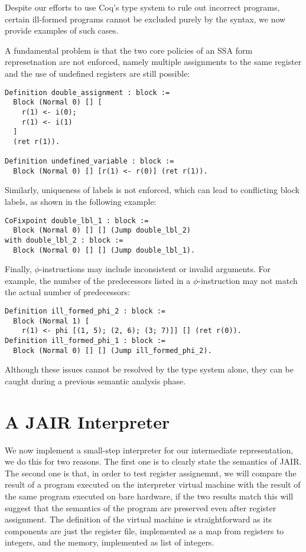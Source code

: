 Despite our efforts to use Coq's type system to rule out incorrect programs, certain ill-formed programs cannot be excluded purely by the syntax, we now provide examples of such cases.

A fundamental problem is that the two core policies of an SSA form represetnation are not enforced, namely multiple assignments to the same register and the use of undefined registers are still possible:

\begin{lstlisting}[style=Coq]
Definition double_assignment : block :=
  Block (Normal 0) [] [
    r(1) <- i(0);
    r(1) <- i(1)
  ]
  (ret r(1)).

Definition undefined_variable : block :=
  Block (Normal 0) [] [r(1) <- r(0)] (ret r(1)).
\end{lstlisting}

Similarly, uniqueness of labels is not enforced, which can lead to conflicting block labels, as shown in the following example:

\begin{lstlisting}[style=Coq]
CoFixpoint double_lbl_1 : block :=
  Block (Normal 0) [] [] (Jump double_lbl_2)
with double_lbl_2 : block :=
  Block (Normal 0) [] [] (Jump double_lbl_1).
\end{lstlisting}

Finally, $\phi$-instructions may include inconsistent or invalid arguments. For example, the number of the predecessors listed in a $\phi$-instruction may not match the actual number of predecessors:

\begin{lstlisting}[style=Coq]
Definition ill_formed_phi_2 : block :=
  Block (Normal 1) [
    r(1) <- phi [(1, 5); (2, 6); (3; 7)]] [] (ret r(0)).
Definition ill_formed_phi_1 : block :=
  Block (Normal 0) [] [] (Jump ill_formed_phi_2).
\end{lstlisting}

Although these issues cannot be resolved by the type system alone, they can be caught during a previous semantic analysis phase.

\section{A JAIR Interpreter}
\label{sec:jair-int}

We now implement a small-step interpreter for our intermediate representation, we do this for two reasons.
The first one is to clearly state the semantics of JAIR. The second one is that, in order to test register assignemnt, we will compare the result of a program executed on the interpreter virtual machine with the result of the same program executed on bare hardware, if the two results match this will suggest that the semantics of the program are preserved even after register assignment.
The definition of the virtual machine is straightforward as its components are just the register file, implemented as a map from registers to integers, and the memory, implemented as list of integers.

